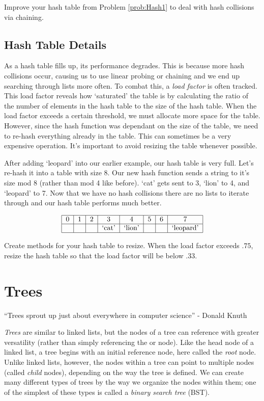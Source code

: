 \begin{problem}
Improve your hash table from Problem \ref{prob:Hash1} to deal with hash collisions via chaining.
\end{problem}

\subsection*{Hash Table Details}
As a hash table fills up, its performance degrades.
This is because more hash collisions occur, causing us to use linear probing or chaining and we end up searching through lists more often.
To combat this, a \emph{load factor} is often tracked.
This load factor reveals how `saturated' the table is by calculating the ratio of the number of elements in the hash table to the size of the hash table.
When the load factor exceeds a certain threshold, we must allocate more space for the table.
However, since the hash function was dependant on the size of the table, we need to re-hash everything already in the table.
This can sometimes be a very expensive operation.
It's important to avoid resizing the table whenever possible.

After adding `leopard' into our earlier example, our hash table is very full. Let's re-hash it into a table with size 8.
Our new hash function sends a string to it's size mod 8 (rather than mod 4 like before).
`cat' gets sent to 3, `lion' to 4, and `leopard' to 7.
Now that we have no hash collisions there are no lists to iterate through and our hash table performs much better.

\[
\begin{tabular}{|c|c|c|c|c|c|c|c|}
\hline
0 & 1 & 2 & 3 & 4 & 5 & 6 & 7 \\
\hline
 & & & `cat' & `lion' & & &`leopard' \\
\hline
\end{tabular}
\]

\begin{problem}
Create methods for your hash table to resize.
When the load factor exceeds $.75$, resize the hash table so that the load factor will be below $.33$.
\label{prob:Hash3}
\end{problem}

\section*{Trees}
``Trees sprout up just about everywhere in computer science'' - Donald Knuth

\emph{Trees} are similar to linked lists, but the nodes of a tree can reference with greater versatility (rather than simply referencing the  or  node).
Like the head node of a linked list, a tree begins with an initial reference node, here called the \emph{root} node.
Unlike linked lists, however, the nodes within a tree can point to multiple nodes (called \emph{child} nodes), depending on the way the tree is defined.
We can create many different types of trees by the way we organize the nodes within them; one of the simplest of these types is called a \emph{binary search tree} (BST).

